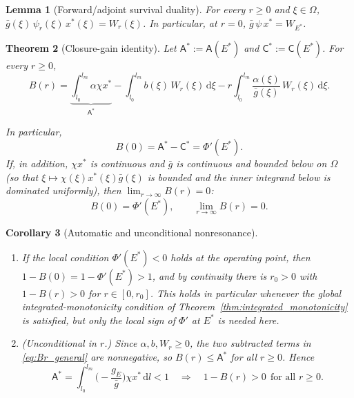 \documentclass[pdflatex,sn-mathphys-num]{sn-jnl}
\newcommand{\Om}{\Omega}
\newcommand{\dd}{\,\mathrm{d}}
\theoremstyle{plain}
\newtheorem{theorem}{Theorem}[section]
\newtheorem{lemma}[theorem]{Lemma}
\newtheorem{corollary}[theorem]{Corollary}
\theoremstyle{definition}
\theoremstyle{remark}
\begin{document}
\begin{lemma}[Forward/adjoint survival duality]
\label{lem:duality}
For every $r\ge0$ and $\xi\in\Om$,
$\displaystyle \bar g(\xi)\,\psi_r(\xi)\,x^*(\xi)=W_r(\xi)$.
In particular, at $r=0$, $\bar g\,\psi\,x^*=W_{E^*}$.
\end{lemma}

\begin{theorem}[Closure-gain identity]
\label{thm:closure_gain_identity}
Let
$\mathsf A^*:=\mathsf A(E^*)$ and $\mathsf C^*:=\mathsf C(E^*)$.
For every $r\ge0$,
\begin{equation}\label{eq:Br_general}
B(r)
=
\underbrace{\int_{l_0}^{l_m}\alpha\chi x^*}_{\mathsf A^*}
-\int_{l_0}^{l_m} b(\xi)\,W_r(\xi)\dd\xi
-r\int_{l_0}^{l_m}\frac{\alpha(\xi)}{\bar g(\xi)}\,W_r(\xi)\dd\xi.
\end{equation}

In particular,
\[
B(0)=\mathsf A^*-\mathsf C^*=\Phi'(E^*).
\]
If, in addition,
$\chi x^*$ is continuous and $\bar g$ is continuous and bounded below on $\Om$
(so that $\xi\mapsto\chi(\xi)x^*(\xi)\bar g(\xi)$ is bounded and the inner integrand
below is dominated uniformly), then $\lim_{r\to\infty}B(r)=0$:
\[
B(0)=\Phi'(E^*),
\qquad
\lim_{r\to\infty}B(r)=0.
\]
\end{theorem}

\begin{corollary}[Automatic and unconditional nonresonance]
\label{cor:nonresonance_consequences}
\leavevmode
\begin{enumerate}[label=(\alph*)]
\item If the local condition $\Phi'(E^*)<0$ holds at the operating point, then
$1-B(0)=1-\Phi'(E^*)>1$, and by continuity there is $r_0>0$ with $1-B(r)>0$ for
$r\in[0,r_0]$. This holds in particular whenever the global integrated-monotonicity
condition of Theorem~\ref{thm:integrated_monotonicity} is satisfied, but only the
local sign of $\Phi'$ at $E^*$ is needed here.
\item (Unconditional in $r$.) Since $\alpha,b,W_r\ge0$, the two subtracted terms in
\eqref{eq:Br_general} are nonnegative, so $B(r)\le\mathsf A^*$ for all $r\ge0$.
Hence
\[
\mathsf A^*
=
\int_{l_0}^{l_m}\Big(-\frac{g_E}{\bar g}\Big)\chi x^*\dd l
<1
\quad\Longrightarrow\quad
1-B(r)>0\ \ \text{for all }r\ge0.
\]
\end{enumerate}
\end{corollary}
\end{document}
